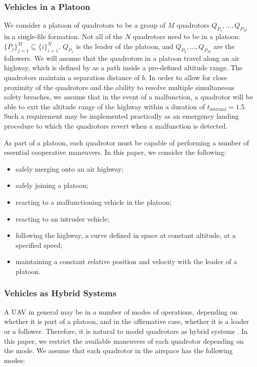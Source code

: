 \subsubsection{Vehicles in a Platoon\label{subsec:platoon_def}}
We consider a platoon of quadrotors to be a group of $M$ quadrotors $Q_{P_1}, \ldots, Q_{P_M}$ in a single-file formation. Not all of the $N$ quadrotors need to be in a platoon: $\{P_j\}_{j=1}^M \subseteq \{i\}_{i=1}^N$. $Q_{P_1}$ is the leader of the platoon, and $Q_{P_2},\ldots,Q_{P_M}$ are the followers. We will assume that the quadrotors in a platoon travel along an air highway, which is defined by as a path inside a pre-defined altitude range. The quadrotors maintain a separation distance of $b$. In order to allow for close proximity of the quadrotors and the ability to resolve multiple simultaneous safety breaches, we assume that in the event of a malfunction, a quadrotor will be able to exit the altitude range of the highway within a duration of $t_\text{internal}=1.5$. Such a requirement may be implemented practically as an emergency landing procedure to which the quadrotors revert when a malfunction is detected.

As part of a platoon, each quadrotor must be capable of performing a number of essential cooperative maneuvers. In this paper, we consider the following: 
\begin{itemize}
\item safely merging onto an air highway;
\item safely joining a platoon;
\item reacting to a malfunctioning vehicle in the platoon;
\item reacting to an intruder vehicle;
\item following the highway, a curve defined in space at constant altitude, at a specified speed;
\item maintaining a constant relative position and velocity with the leader of a platoon.
\end{itemize}

\subsubsection{Vehicles as Hybrid Systems}
A UAV in general may be in a number of modes of operations, depending on whether it is part of a platoon, and in the affirmative case, whether it is a leader or a follower. Therefore, it is natural to model quadrotors as hybrid systems \cite{Lygeros98,Lygeros12}. In this paper, we restrict the available maneuvers of each quadrotor depending on the mode. We assume that each quadrotor in the airspace has the following modes:

